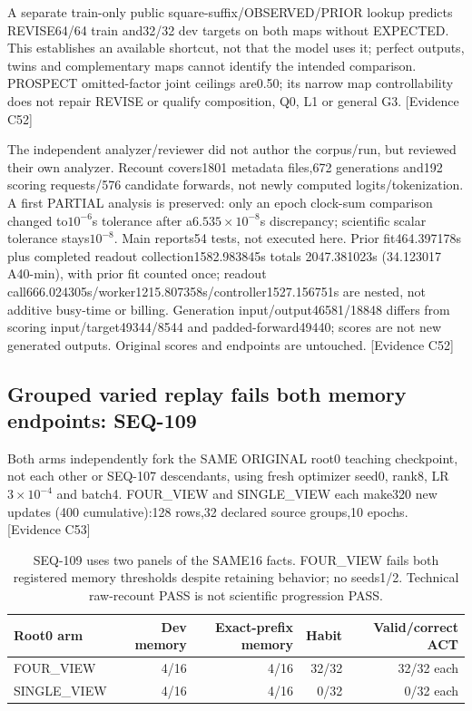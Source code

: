 \documentclass[11pt]{article}
\newcommand{\ev}[1]{\textsf{[Evidence #1]}}
\begin{document}
A separate train-only public square-suffix/OBSERVED/PRIOR lookup predicts
REVISE64/64 train and32/32 dev targets on both maps without EXPECTED. This
establishes an available shortcut, not that the model uses it; perfect outputs,
twins and complementary maps cannot identify the intended comparison.
PROSPECT omitted-factor joint ceilings are0.50; its narrow map controllability
does not repair REVISE or qualify composition, Q0, L1 or general G3. \ev{C52}

The independent analyzer/reviewer did not author the corpus/run, but reviewed
their own analyzer. Recount covers1801 metadata files,672 generations and192
scoring requests/576 candidate forwards, not newly computed logits/tokenization.
A first PARTIAL analysis is preserved: only an epoch clock-sum comparison changed
to$10^{-6}$s tolerance after a$6.535\times10^{-8}$s discrepancy; scientific
scalar tolerance stays$10^{-8}$. Main reports54 tests, not executed here.
Prior fit464.397178s plus completed readout collection1582.983845s totals
2047.381023s (34.123017 A40-min), with prior fit counted once; readout
call666.024305s/worker1215.807358s/controller1527.156751s are nested, not
additive busy-time or billing. Generation input/output46581/18848 differs
from scoring input/target49344/8544 and padded-forward49440; scores are not
new generated outputs. Original scores and endpoints are untouched. \ev{C52}

\subsection{Grouped varied replay fails both memory endpoints: SEQ-109}
Both arms independently fork the SAME ORIGINAL root0 teaching checkpoint,
not each other or SEQ-107 descendants, using fresh optimizer seed0, rank8,
LR$3\times10^{-4}$ and batch4. FOUR\_VIEW and SINGLE\_VIEW each make320 new
updates (400 cumulative):128 rows,32 declared source groups,10 epochs. \ev{C53}

\begin{table}[ht]
\centering\small
\begin{tabular}{lrrrr}
\toprule
Root0 arm & Dev memory & Exact-prefix memory & Habit & Valid/correct ACT \\
\midrule
FOUR\_VIEW & 4/16 & 4/16 & 32/32 & 32/32 each \\
SINGLE\_VIEW & 4/16 & 4/16 & 0/32 & 0/32 each \\
\bottomrule
\end{tabular}
\caption{SEQ-109 uses two panels of the SAME16 facts. FOUR\_VIEW fails both
registered memory thresholds despite retaining behavior; no seeds1/2.
Technical raw-recount PASS is not scientific progression PASS.}
\label{tab:seq109-varied}
\end{table}
\end{document}
